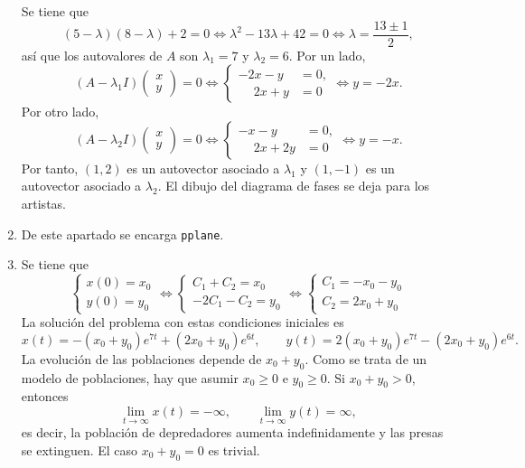 \documentclass[11pt]{report}
\begin{document}
\begin{solution}
\begin{enumerate}
        Se tiene que
        \[(5-\lambda)(8-\lambda)+2=0 \iff \lambda^2-13\lambda +42 = 0 \iff \lambda = \frac{13\pm 1}{2},\]
        así que los autovalores de $A$ son $\lambda_1 = 7$ y $\lambda_2 = 6$. Por un lado,
        \[(A-\lambda_1I)\left(\begin{array}{c}
            x \\
            y
        \end{array}\right) = 0 \iff \begin{cases}
            -2x-y&= 0, \\
            \phantom{-}2x+y&= 0
        \end{cases} \iff y = -2x.\]
        Por otro lado,
        \[(A-\lambda_2I)\left(\begin{array}{c}
            x \\
            y
        \end{array}\right) = 0 \iff \begin{cases}
            -x-y&= 0, \\
            \phantom{-}2x+2y&= 0
        \end{cases} \iff y = -x.\]
        Por tanto, $(1,2)$ es un autovector asociado a $\lambda_1$ y $(1,-1)$ es un autovector asociado a $\lambda_2$. El dibujo del diagrama de fases se deja para los artistas. 
        \item De este apartado se encarga \texttt{pplane}.
        \item Se tiene que
        \[\begin{cases}
            x(0)=x_0 \\
            y(0) = y_0
        \end{cases} \iff \begin{cases}
            C_1+C_2 = x_0 \\
            -2C_1-C_2 = y_0
        \end{cases} \iff \begin{cases}
            C_1 = -x_0-y_0 \\
            C_2 = 2x_0+y_0
        \end{cases}\]
        La solución del problema con estas condiciones iniciales es
        \[x(t) = -(x_0+y_0)e^{7t} + (2x_0+y_0)e^{6t}, \qquad y(t) = 2(x_0+y_0)e^{7t}-(2x_0+y_0)e^{6t}.\]
        La evolución de las poblaciones depende de $x_0+y_0$. Como se trata de un modelo de poblaciones, hay que asumir $x_0 \geq 0$ e $y_0\geq 0$. Si $x_0+y_0>0$, entonces
        \[\lim_{t\to\infty}x(t) = -\infty, \qquad \lim_{t\to\infty}y(t) = \infty,\]
        es decir, la población de depredadores aumenta indefinidamente y las presas se extinguen. El caso $x_0+y_0=0$ es trivial.
    \end{enumerate} 
\end{solution}
\end{document}
